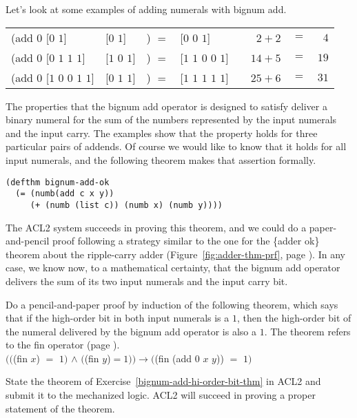 Let's look at some examples of adding numerals with bignum \textsf{add}.
\begin{center}
\begin{tabular}{llll|rcr}
\textsf{(add $0$ [$0$ $1$]}             &\textsf{[$0$ $1$]}    &\textsf{)} $=$ &\textsf{[$0$ $0$ $1$]}         & ~~$2 + 2$  &$=$& $4$   \\
\textsf{(add $0$ [$0$ $1$ $1$ $1$]}     &\textsf{[$1$ $0$ $1$]}&\textsf{)} $=$ &\textsf{[$1$ $1$ $0$ $0$ $1$]} & ~~$14 + 5$ &$=$& $19$ \\
\textsf{(add $0$ [$1$ $0$ $0$ $1$ $1$]} &\textsf{[$0$ $1$ $1$]}&\textsf{)} $=$ &\textsf{[$1$ $1$ $1$ $1$ $1$]} & ~~$25 + 6$ &$=$& $31$ \\
\end{tabular}
\end{center}

The properties that the bignum \textsf{add} operator is designed to satisfy
deliver a binary numeral for the sum of
the numbers represented by the input numerals and the input carry.
The examples show that the property holds for three
particular pairs of addends.
Of course we would like to know that it
holds for all input numerals, and
the following theorem makes that assertion formally.

\label{bignum-adder-thm}
\begin{Verbatim}
(defthm bignum-add-ok
  (= (numb(add c x y))
     (+ (numb (list c)) (numb x) (numb y))))
\end{Verbatim}

The ACL2 system succeeds in proving this theorem,
and we could do a paper-and-pencil proof following a strategy
similar to the one for the \{adder ok\} theorem about the ripple-carry adder
(Figure~\ref{fig:adder-thm-prf}, page \pageref{fig:adder-thm-prf}).
In any case, we know now, to a mathematical certainty,
that the bignum \textsf{add} operator delivers
the sum of its two input numerals and the input carry bit.

\begin{ExerciseList}
\Exercise \label{bignum-add-hi-order-bit-thm}
Do a pencil-and-paper proof by induction of the following
theorem, which says that if the high-order bit in both input numerals is a $1$,
then the high-order bit of the numeral delivered
by the bignum \textsf{add} operator is also a $1$.
The theorem refers to the \textsf{fin} operator (page \pageref{fin-defun}).\\
\hspace*{1cm}$(($\textsf{(fin $x$) $=$ $1)$ $\wedge$ $($(fin $y$)}$= 1)) 
\rightarrow ($\textsf{(fin (add 0 $x$ $y$))} $=$ $1)$

\Exercise State the theorem of Exercise~\ref{bignum-add-hi-order-bit-thm}
in ACL2 and submit it to the mechanized logic.
ACL2 will succeed in proving a proper statement of the theorem.
\end{ExerciseList}

